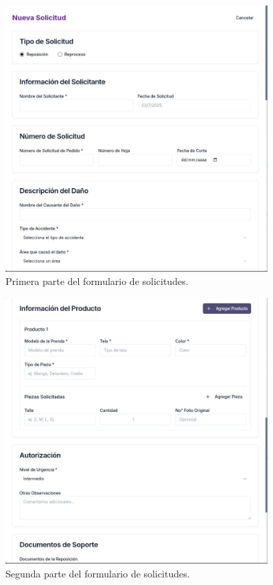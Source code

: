 \documentclass[12pt,letterpaper,spanish]{report}
\begin{document}
\begin{figure}[H]
    \centering
    \includegraphics[width=0.9\textwidth]{form_repo1.jpg}
    \caption{Primera parte del formulario de solicitudes.}
    \label{fig:form1}
\end{figure}
\begin{figure}[H]
    \centering
    \includegraphics[width=0.9\textwidth]{form_repo2.jpg}
    \caption{Segunda parte del formulario de solicitudes.}
    \label{fig:form2}
\end{figure}
\end{document}
